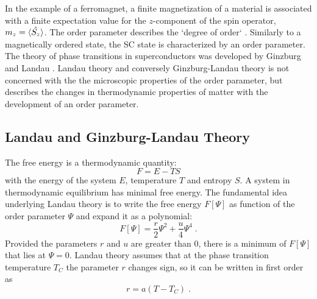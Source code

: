 \documentclass[../notes.tex]{subfiles}
\begin{document}
In the example of a ferromagnet, a finite magnetization of a material is associated with a finite expectation value for the \(z\)-component of the spin operator, \(m_z = \braket{\hat{S_z}}\).
The order parameter describes the `degree of order` \cite{landauTheoryPhaseTransitions1937}.
Similarly to a magnetically ordered state, the SC state is characterized by an order parameter.
The theory of phase transitions in superconductors was developed by Ginzburg and Landau \cite{ginzburgTheorySuperconductivity1950}.
Landau theory and conversely Ginzburg-Landau theory is not concerned with the the microscopic properties of the order parameter, but describes the changes in thermodynamic properties of matter with the development of an order parameter.

\subsection{Landau and Ginzburg-Landau Theory}\label{sub:Landau and Ginzburg-Landau Theory}

The free energy is a thermodynamic quantity:
\begin{equation}
	F = E - T S
\end{equation}
with the energy of the system \(E\), temperature \(T\) and entropy \(S\).
A system in thermodynamic equilibrium has minimal free energy.
The fundamental idea underlying Landau theory is to write the free energy \(F[\Psi]\) as function of the order parameter \(\Psi\) and expand it as a polynomial:
\begin{equation}
	F[\Psi] = \frac{r}{2} \Psi^2 + \frac{u}{4} \Psi^4 \;.
\end{equation}
Provided the parameters \(r\) and \(u\) are greater than \(0\), there is a minimum of \(F[\Psi]\) that lies at \(\Psi = 0\).
Landau theory assumes that at the phase transition temperature \(T_C\) the parameter \(r\) changes sign, so it can be written in first order as
\begin{equation}
	r = a(T - T_C) \;.
\end{equation}

\begin{figure}[t]
	\centering
	\begin{subfigure}[b]{0.5\textwidth}
		\centering
		
		\caption{\label{sfig:Landau free energy}}
	\end{subfigure}%
	\begin{subfigure}[b]{0.5\textwidth}
		\centering
		
		\caption{\label{sfig:Ginzburg Landau free energy}}
	\end{subfigure}
	\label{fig:Landau free energy and Ginzburg-Landau free energy}
\end{figure}
\end{document}
